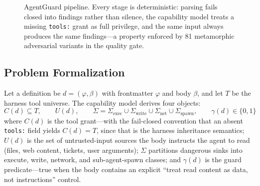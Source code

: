 \documentclass[11pt]{article}
\begin{document}
\begin{figure}[t]
\centering
{}
\caption{AgentGuard pipeline. Every stage is deterministic: parsing fails closed into findings
rather than silence, the capability model treats a missing \texttt{tools:} grant as full
privilege, and the same input always produces the same findings---a property enforced by 81
metamorphic adversarial variants in the quality gate.}
\label{fig:system}
\end{figure}

\subsection{Problem Formalization}
Let a definition be $d = (\varphi, \beta)$ with frontmatter $\varphi$ and body $\beta$, and let
$T$ be the harness tool universe. The capability model derives four objects:
\[
  C(d) \subseteq T, \qquad U(d), \qquad
  \Sigma = \Sigma_{\mathrm{exec}} \cup \Sigma_{\mathrm{write}} \cup \Sigma_{\mathrm{net}}
         \cup \Sigma_{\mathrm{spawn}}, \qquad \gamma(d) \in \{0, 1\}
\]
where $C(d)$ is the tool grant---with the fail-closed convention that an absent \texttt{tools:}
field yields $C(d) = T$, since that is the harness inheritance semantics; $U(d)$ is the set of
untrusted-input sources the body instructs the agent to read (files, web content, tickets, user
arguments); $\Sigma$ partitions dangerous sinks into execute, write, network, and sub-agent-spawn
classes; and $\gamma(d)$ is the guard predicate---true when the body contains an explicit
``treat read content as data, not instructions'' control.
\end{document}
